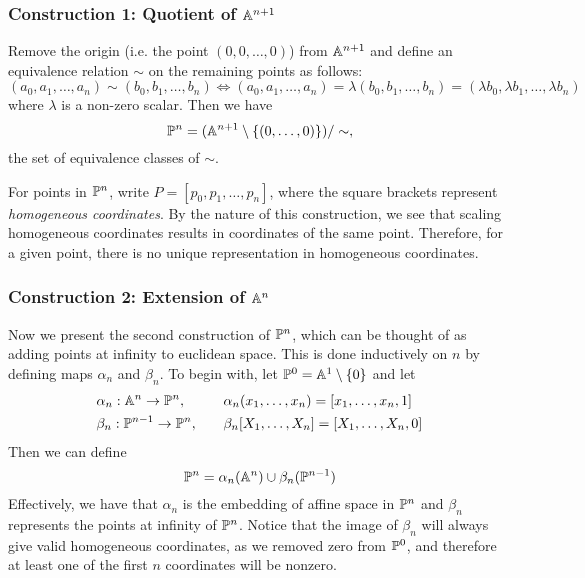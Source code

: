 \subsubsection{Construction 1: Quotient of $\an[n+1]$}
Remove the origin (i.e. the point $(0,0,\ldots,0)$) from $\an[n+1]$ and define an equivalence relation $\sim$ on the remaining points as follows:
$$(a_0,a_1,\ldots,a_n) \sim (b_0,b_1,\ldots,b_n) \iff (a_0,a_1,\ldots,a_n) = \lambda(b_0,b_1,\ldots,b_n) = (\lambda b_0,\lambda b_1,\ldots,\lambda b_n)$$
where $\lambda$ is a non-zero scalar. Then we have 
$$\pn = (\an[n+1]\setminus\{(0,\ldots,0)\})/\sim,$$
the set of equivalence classes of $\sim$.

For points in $\pn$, write $P = [p_0,p_1,\ldots,p_n]$, where the square brackets represent \emph{homogeneous coordinates}.
By the nature of this construction, we see that scaling homogeneous coordinates results in coordinates of the same point.
Therefore, for a given point, there is no unique representation in homogeneous coordinates.

\subsubsection{Construction 2: Extension of $\an[n]$}
Now we present the second construction of $\pn$, which can be thought of as adding points at infinity to euclidean space.
This is done inductively on $n$ by defining maps $\alpha_n$ and $\beta_n$.
To begin with, let $\pn[0] = \an[1] \setminus \{0\}$ and let
\begin{alignat*}{2}
&\alpha_n : \an \rightarrow \pn,\quad &&\alpha_n(x_1,\ldots,x_n) = [x_1,\ldots,x_n,1]\\
 &\beta_n : \pn[n-1] \rightarrow \pn,\quad &&\beta_n[X_1,\ldots,X_n] = [X_1,\ldots,X_n,0]
\end{alignat*}
Then we can define
$$\pn = \alpha_n(\an) \cup \beta_n(\pn[n-1])$$
Effectively, we have that $\alpha_n$ is the embedding of affine space in $\pn$ and $\beta_n$ represents the points at infinity of $\pn$.
Notice that the image of $\beta_n$ will always give valid homogeneous coordinates, as we removed zero from $\pn[0]$, and therefore at least one of the first $n$ coordinates will be nonzero.
